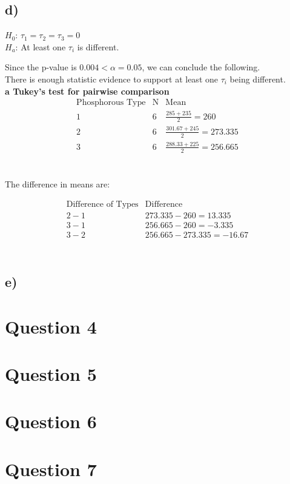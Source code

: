 \documentclass{article}
\begin{document}
\subsection*{d)}
\begin{flushleft}
    $H_0$: $\tau_1 = \tau_2 = \tau_3 = 0$ \\
    $H_a$: At least one $\tau_i$ is different.\\
\end{flushleft}
Since the p-value is $0.004 < \alpha = 0.05$, we can conclude the following. \\
There is enough statistic evidence to support at least one $\tau_i$ being different.
\\
\textbf{a Tukey’s test for pairwise comparison} \\
\begin{equation*}
    \begin{array}{c|c|c}
        \text{Phosphorous Type} &\text{N}& \text{Mean} \\
        \hline
        1 & 6 & \frac{285+235}{2} = 260\\
        2 & 6 & \frac{301.67+245}{2} = 273.335\\
        3 & 6 & \frac{288.33+225}{2} = 256.665\\
    
    \end{array}
    \end{equation*}\\
\begin{flushleft}
    The difference in means are:
\end{flushleft}
\begin{equation*}
    \begin{array}{c|c}
        \text{Difference of Types} &\text{Difference}\\
        \hline
        2 - 1 & 273.335 - 260 = 13.335\\
        3 - 1 & 256.665 - 260 = -3.335\\
        3 - 2 & 256.665 - 273.335 = -16.67\\
    
    \end{array}
    \end{equation*}\\

\subsection*{e)}

\section*{Question 4}

\section*{Question 5}

\section*{Question 6}

\section*{Question 7}
\end{document}
